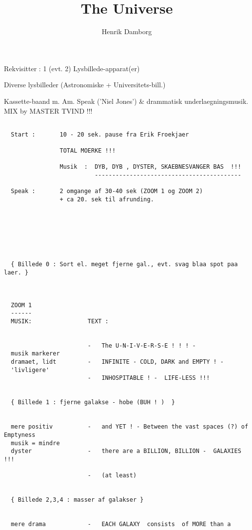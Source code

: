 \documentclass[a4paper,11pt]{article}
\title{The Universe}
\author{Henrik Damborg   }
\begin{document}
\maketitle

\begin{roles}

  Rekvisitter : 1 (evt. 2) Lysbillede-apparat(er)

                Diverse lysbilleder  (Astronomiske + Universitets-bill.)

                Kassette-baand m. Am. Speak ('Niel Jones') \& drammatisk
                underlaegningsmusik. MIX by MASTER TVIND !!! 
\end{roles}

\begin{sketch}

\begin{verbatim}

  Start :       10 - 20 sek. pause fra Erik Froekjaer
           
                TOTAL MOERKE !!!

                Musik  :  DYB, DYB , DYSTER, SKAEBNESVANGER BAS  !!!
                          ------------------------------------------

  Speak :       2 omgange af 30-40 sek (ZOOM 1 og ZOOM 2) 
                + ca 20. sek til afrunding.







  { Billede 0 : Sort el. meget fjerne gal., evt. svag blaa spot paa laer. }



  ZOOM 1
  ------   
  MUSIK:                TEXT :


                        -   The U-N-I-V-E-R-S-E ! ! ! -
  musik markerer
  dramaet, lidt         -   INFINITE - COLD, DARK and EMPTY ! -
  'livligere'
                        -   INHOSPITABLE ! -  LIFE-LESS !!!


  { Billede 1 : fjerne galakse - hobe (BUH ! )  }


  mere positiv          -   and YET ! - Between the vast spaces (?) of Emptyness
  musik = mindre
  dyster                -   there are a BILLION, BILLION -  GALAXIES !!!

                        -   (at least) 


  { Billede 2,3,4 : masser af galakser }


  mere drama            -   EACH GALAXY  consists  of MORE than a


\end{verbatim}
\end{sketch}
\end{document}
